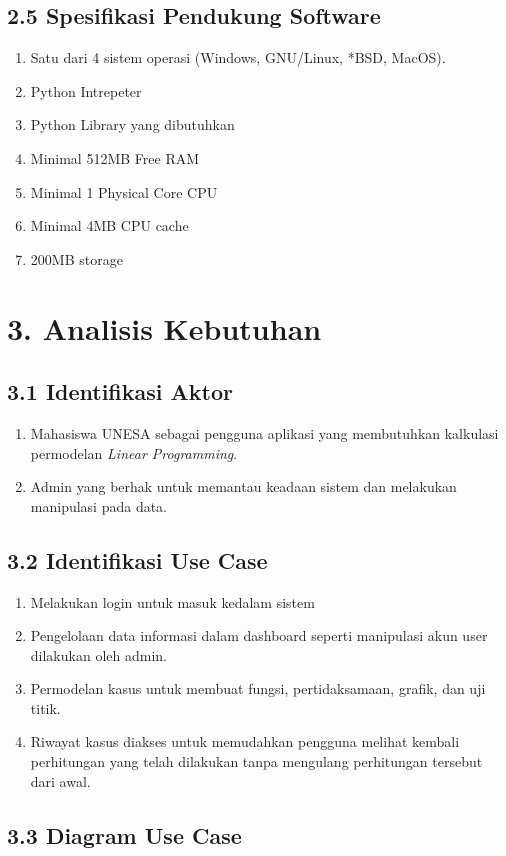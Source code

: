 \documentclass[a4paper]{article}
\begin{document}
    \subsection*{2.5 Spesifikasi Pendukung Software}
    \begin{enumerate}
        \item Satu dari 4 sistem operasi (Windows, GNU/Linux, *BSD, MacOS).
        \item Python Intrepeter
        \item Python Library yang dibutuhkan
        \item Minimal 512MB Free RAM 
        \item Minimal 1 Physical Core CPU
        \item Minimal 4MB CPU cache
        \item 200MB storage
    \end{enumerate}
\section*{3. Analisis Kebutuhan}
    \subsection*{3.1 Identifikasi Aktor}
    \begin{enumerate}
        \item Mahasiswa UNESA sebagai pengguna aplikasi yang
        membutuhkan kalkulasi permodelan \textit{Linear Programming}.
        \item Admin yang berhak untuk memantau keadaan sistem 
        dan melakukan manipulasi pada data.
    \end{enumerate}
    \subsection*{3.2 Identifikasi Use Case}
    \begin{enumerate}
        \item Melakukan login untuk masuk kedalam sistem
        \item Pengelolaan data informasi dalam dashboard
        seperti manipulasi akun user dilakukan oleh admin.
        \item Permodelan kasus untuk membuat fungsi, pertidaksamaan,
        grafik, dan uji titik.
        \item Riwayat kasus diakses untuk memudahkan pengguna melihat
        kembali perhitungan yang telah dilakukan tanpa mengulang
        perhitungan tersebut dari awal.
    \end{enumerate}
    \subsection*{3.3 Diagram Use Case}
\end{document}
